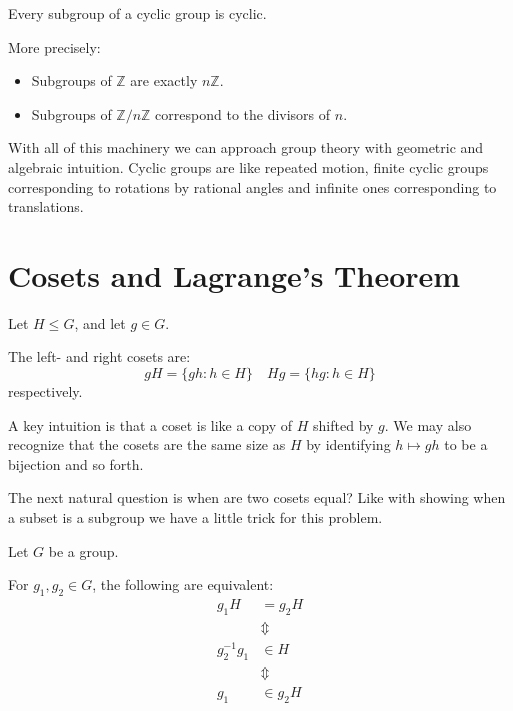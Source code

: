 \begin{thm}
    Every subgroup of a cyclic group is cyclic. 

    More precisely: 
    \begin{itemize}
        \item Subgroups of $\mathbb Z$ are exactly $n\mathbb Z$.
        \item Subgroups of $\mathbb Z/n\mathbb Z$ correspond 
            to the divisors of $n$.
    \end{itemize}
\end{thm}

With all of this machinery we can approach group theory with geometric
and algebraic intuition. Cyclic groups are like repeated motion, 
finite cyclic groups corresponding to rotations by rational angles 
and infinite ones corresponding to translations. 

\newpage 
\section{Cosets and Lagrange's Theorem}
\begin{defn}
    Let $H \leq G$, and let $g \in G$. 

    The left- and right cosets are: 
    $$ 
        gH = \{gh : h \in H\} \quad Hg = \{hg : h \in H\}
    $$ 
    respectively.
\end{defn}

A key intuition is that a coset is like a copy of $H$ shifted 
by $g$. 
We may also recognize that the cosets are the same size as $H$ by 
identifying $h \mapsto gh$ to be a bijection and so forth. 

The next natural question is when are two cosets equal? 
Like with showing when a subset is a subgroup we have a little trick 
for this problem. 

\begin{thm}
    Let $G$ be a group. 

    For $g_1, g_2 \in G$, the following are equivalent: 
    \begin{align*}
        g_1 H &= g_2 H \\ 
              &\Updownarrow \\ 
        g_2^{-1}g_1 &\in H \\ 
                    &\Updownarrow \\ 
        g_1 &\in g_2 H 
    \end{align*}
\end{thm}

